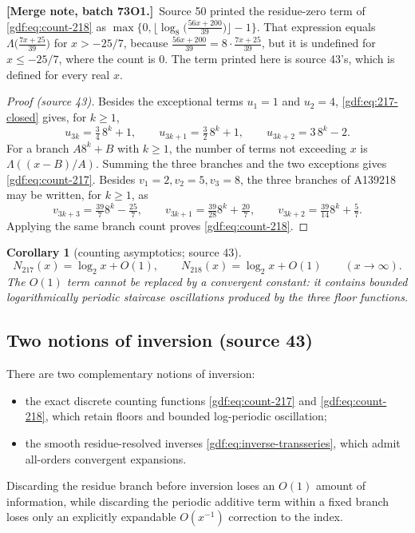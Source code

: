 \documentclass[11pt,a4paper]{article}
\numberwithin{equation}{section}
\newtheorem{corollary}[theorem]{Corollary}
\theoremstyle{definition}
\theoremstyle{remark}
\theoremstyle{plain}
\newcommand{\mergenote}[1]{\par\smallskip\noindent\textbf{[Merge note, batch 73O1.]}\ #1\par\smallskip}
\newcommand{\src}[1]{\textup{(source #1)}}
\begin{document}
\mergenote{Source 50 printed the residue-zero term of
\eqref{gdf:eq:count-218} as
$\max\bigl\{0,\lfloor\log_8\bigl(\frac{56x+200}{39}\bigr)\rfloor-1\bigr\}$.
That expression equals $\Lambda\bigl(\frac{7x+25}{39}\bigr)$ for
$x>-25/7$, because $\frac{56x+200}{39}=8\cdot\frac{7x+25}{39}$, but it is
undefined for $x\le-25/7$, where the count is $0$.  The term printed here is
source 43's, which is defined for every real $x$.}

\begin{proof}[Proof \src{43}]
Besides the exceptional terms $u_1=1$ and $u_2=4$, \eqref{gdf:eq:217-closed}
gives, for $k\ge1$,
\[
 u_{3k}=\tfrac34\,8^k+1,\qquad
 u_{3k+1}=\tfrac32\,8^k+1,\qquad
 u_{3k+2}=3\,8^k-2.
\]
For a branch $A8^k+B$ with $k\ge1$, the number of terms not exceeding $x$ is
$\Lambda((x-B)/A)$.  Summing the three branches and the two exceptions gives
\eqref{gdf:eq:count-217}.  Besides $v_1=2,v_2=5,v_3=8$, the three branches of
A139218 may be written, for $k\ge1$, as
\[
 v_{3k+3}=\tfrac{39}{7}8^k-\tfrac{25}{7},\qquad
 v_{3k+1}=\tfrac{39}{28}8^k+\tfrac{20}{7},\qquad
 v_{3k+2}=\tfrac{39}{14}8^k+\tfrac{5}{7}.
\]
Applying the same branch count proves \eqref{gdf:eq:count-218}.
\end{proof}

\begin{corollary}[counting asymptotics; source 43]\label{gdf:cor:counting-asymptotics}
\[
 N_{217}(x)=\log_2 x+O(1),
 \qquad
 N_{218}(x)=\log_2 x+O(1)
 \qquad(x\to\infty).
\]
The $O(1)$ term cannot be replaced by a convergent constant: it contains
bounded logarithmically periodic staircase oscillations produced by the three
floor functions.
\end{corollary}

\subsection{Two notions of inversion \src{43}}

There are two complementary notions of inversion:
\begin{itemize}
\item the exact discrete counting functions \eqref{gdf:eq:count-217} and
      \eqref{gdf:eq:count-218}, which retain floors and bounded log-periodic
      oscillation;
\item the smooth residue-resolved inverses \eqref{gdf:eq:inverse-transseries},
      which admit all-orders convergent expansions.
\end{itemize}
Discarding the residue branch before inversion loses an $O(1)$ amount of
information, while discarding the periodic additive term within a fixed branch
loses only an explicitly expandable $O(x^{-1})$ correction to the index.
\end{document}
